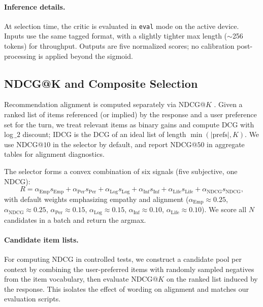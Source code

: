 \documentclass[12pt]{article}
\begin{document}
  \paragraph{Inference details.} At selection time, the critic is evaluated in \texttt{eval} mode on the active device. Inputs use the same tagged format, with a slightly tighter max length (\(\sim\)256 tokens) for throughput. Outputs are five normalized scores; no calibration post-processing is applied beyond the sigmoid.
  
  \subsection{NDCG@K and Composite Selection}
  Recommendation alignment is computed separately via NDCG@\(K\) \citep{evidently_ndcg}. Given a ranked list of items referenced (or implied) by the response and a user preference set for the turn, we treat relevant items as binary gains and compute DCG with log\,\(\_2\) discount; IDCG is the DCG of an ideal list of length \(\min(\lvert\text{prefs}\rvert, K)\). We use NDCG@\(10\) in the selector by default, and report NDCG@\(50\) in aggregate tables for alignment diagnostics.
  
  The selector forms a convex combination of six signals (five subjective, one NDCG):
  \[
  R = \alpha_{\mathrm{Emp}} s_{\mathrm{Emp}} + \alpha_{\mathrm{Per}} s_{\mathrm{Per}} + \alpha_{\mathrm{Log}} s_{\mathrm{Log}} + \alpha_{\mathrm{Inf}} s_{\mathrm{Inf}} + \alpha_{\mathrm{Life}} s_{\mathrm{Life}} + \alpha_{\mathrm{NDCG}} s_{\mathrm{NDCG}},
  \]
  with default weights emphasizing empathy and alignment (\(\alpha_{\mathrm{Emp}}\approx 0.25\), \(\alpha_{\mathrm{NDCG}}\approx 0.25\), \(\alpha_{\mathrm{Per}}\approx 0.15\), \(\alpha_{\mathrm{Log}}\approx 0.15\), \(\alpha_{\mathrm{Inf}}\approx 0.10\), \(\alpha_{\mathrm{Life}}\approx 0.10\)). We score all $N$ candidates in a batch and return the argmax.
  
  \paragraph{Candidate item lists.} For computing NDCG in controlled tests, we construct a candidate pool per context by combining the user-preferred items with randomly sampled negatives from the item vocabulary, then evaluate NDCG@\(K\) on the ranked list induced by the response. This isolates the effect of wording on alignment and matches our evaluation scripts.
  
\end{document}
